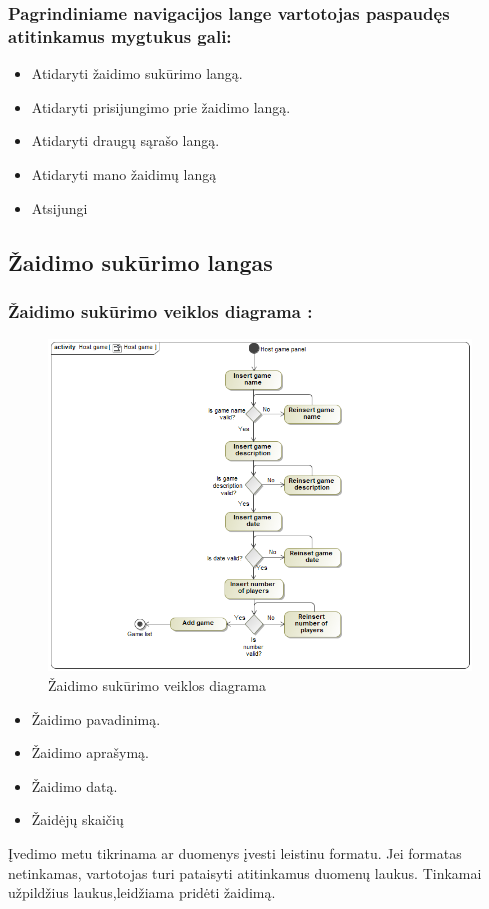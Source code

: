 \documentclass{VUMIFPSkursinis}
\begin{document}
		\subsubsection*{Pagrindiniame navigacijos lange vartotojas paspaudęs atitinkamus mygtukus gali:}
			\renewcommand{\labelitemi}{$\bullet$}
			\begin{itemize}
				\item Atidaryti žaidimo sukūrimo langą.
				\item Atidaryti prisijungimo prie žaidimo langą.
				\item Atidaryti draugų sąrašo langą.
				\item Atidaryti mano žaidimų langą
				\item Atsijungi
			\end{itemize}

	\subsection{Žaidimo sukūrimo langas}
		\subsubsection*{Žaidimo sukūrimo veiklos diagrama :}
			\begin{figure}[H]
				\centering
				\includegraphics[scale=0.5]{img/HostGame_activity}
				\caption{Žaidimo sukūrimo veiklos diagrama}
				\label{img:Hostgame_activity}
			\end{figure}
				\renewcommand{\labelitemi}{$\bullet$}
				\begin{itemize}
					\item Žaidimo pavadinimą.
					\item Žaidimo aprašymą.
					\item Žaidimo datą.
					\item Žaidėjų skaičių
				\end{itemize}
			Įvedimo metu tikrinama ar duomenys įvesti leistinu formatu. Jei formatas 
			netinkamas, vartotojas turi pataisyti atitinkamus duomenų laukus. Tinkamai
			užpildžius laukus,leidžiama pridėti žaidimą.
\end{document}
